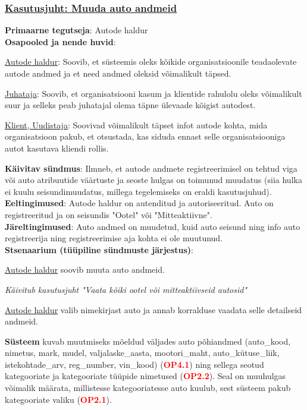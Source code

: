 \begin{shaded}
	\subsubsection{\underline{Kasutusjuht: Muuda auto andmeid}}
	\textbf{Primaarne tegutseja}: Autode haldur \\
	\textbf{Osapooled ja nende huvid}: 
	\useDash
	\begin{myitemize}
		\item \underline{Autode haldur}: Soovib, et süsteemis oleks kõikide organisatsioonile teadaolevate autode andmed ja et need andmed oleksid võimalikult täpsed.
		\item \underline{Juhataja}: Soovib, et organisatsiooni kasum ja klientide rahulolu oleks võimalikult suur ja selleks peab juhatajal olema täpne ülevaade kõigist autodest. 
		\item \underline{Klient, Uudistaja}: Soovivad võimalikult täpset infot autode kohta, mida organisatsioon pakub, et otsustada, kas siduda ennast selle organisatsiooniga autot kasutava kliendi rollis.
	\end{myitemize}
	\textbf{Käivitav sündmus}: Ilmneb, et autode andmete registreerimisel on tehtud viga või 
	auto atribuutide väärtuste ja seoste hulgas on toimunud muudatus (siia hulka ei kuulu seisundimuudatus, millega tegelemiseks on eraldi kasutusjuhud). \\
	\textbf{Eeltingimused}: Autode haldur on autenditud ja autoriseeritud. Auto on registreeritud ja on seisundis "Ootel" või "Mitteaktiivne". \\
	\textbf{Järeltingimused}: Auto andmed on muudetud, kuid auto seisund ning info auto registreerija ning registreerimise aja kohta ei ole muutunud. \\
	\textbf{Stsenaarium (tüüpiline sündmuste järjestus)}:
	\begin{myenumerate}
		\item \underline{Autode haldur} soovib muuta auto andmeid.
		\item \textit{Käivitub kasutusjuht "Vaata kõiki ootel või mitteaktiivseid autosid"}
		\item \underline{Autode haldur} valib nimekirjast auto ja annab korralduse vaadata selle detailseid andmeid.
		\item \textbf{Süsteem} kuvab muutmiseks mõeldud väljades auto põhiandmed  (auto\_kood, nimetus, mark, mudel, valjalaske\_aasta, mootori\_maht, auto\_kütuse\_liik, istekohtade\_arv, reg\_number, vin\_kood) (\textbf{\textcolor{red}{OP4.1}}) ning sellega seotud kategooriate ja kategooriate tüüpide nimetused (\textbf{\textcolor{red}{OP2.2}}). Seal on muuhulgas võimalik määrata, millistesse kategooriatesse auto kuulub, sest süsteem pakub kategooriate valiku (\textbf{\textcolor{red}{OP2.1}}).

\end{myenumerate}
\end{shaded}
